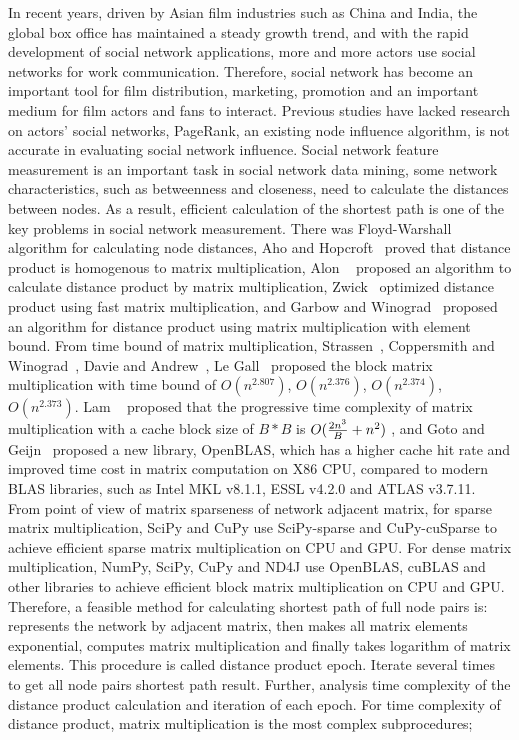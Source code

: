 \documentclass[review]{cvpr}
\begin{document}
In recent years, driven by Asian film industries such as China and India, the global box office has maintained a steady growth trend, and with the rapid development of social network applications, more and more actors use social networks for work communication.
Therefore, social network has become an important tool for film distribution, marketing, promotion and an important medium for film actors and fans to interact.
Previous studies have lacked research on actors' social networks, PageRank, an existing node influence algorithm, is not accurate in evaluating social network influence.
Social network feature measurement is an important task in social network data mining, some network characteristics, such as betweenness and closeness, need to calculate the distances between nodes.
As a result, efficient calculation of the shortest path is one of the key problems in social network measurement.
There was Floyd-Warshall~\cite{floyd1962algorithm,warshall1962theorem} algorithm for calculating node distances, Aho and Hopcroft~\cite{aho1974design} proved that distance product is homogenous to matrix multiplication,
Alon \etal~\cite{alon1997exponent} proposed an algorithm to calculate distance product by matrix multiplication, Zwick~\cite{zwick2002all} optimized distance product using fast matrix multiplication,
and Garbow and Winograd~\cite{garbow1985scaling} proposed an algorithm for distance product using matrix multiplication with element bound.
From time bound of matrix multiplication, Strassen~\cite{strassen1969gaussian}, Coppersmith and Winograd~\cite{coppersmith1987matrix}, Davie and Andrew~\cite{davie2013improved}, Le Gall~\cite{le2014powers} proposed the block matrix multiplication with time bound of \(O(n ^ {2.807})\), \(O(n^{2.376})\), \(O(n^{2.374})\), \(O(n^{2.373})\).
Lam \etal~\cite{lam1991cache} proposed that the progressive time complexity of matrix multiplication with a cache block size of $B*B$ is \(O({2n^3 \over B}+{n^2})\) ,
and Goto and Geijn~\cite{goto2008anatomy} proposed a new library, OpenBLAS, which has a higher cache hit rate and improved time cost in matrix computation on X86 CPU, compared to modern BLAS libraries, such as Intel MKL v8.1.1, ESSL v4.2.0 and ATLAS v3.7.11.
From point of view of matrix sparseness of network adjacent matrix, for sparse matrix multiplication, SciPy  and CuPy  use SciPy-sparse and CuPy-cuSparse to achieve efficient sparse matrix multiplication on CPU and GPU.
For dense matrix multiplication, NumPy, SciPy, CuPy and ND4J use OpenBLAS, cuBLAS and other libraries to achieve efficient block matrix multiplication on CPU and GPU.
Therefore, a feasible method for calculating shortest path of full node pairs is: represents the network by adjacent matrix, then makes all matrix elements exponential, computes matrix multiplication and finally takes logarithm of matrix elements.
This procedure is called distance product epoch.
Iterate several times to get all node pairs shortest path result.
Further, analysis time complexity of the distance product calculation and iteration of each epoch.
For time complexity of distance product, matrix multiplication is the most complex subprocedures;
\end{document}
